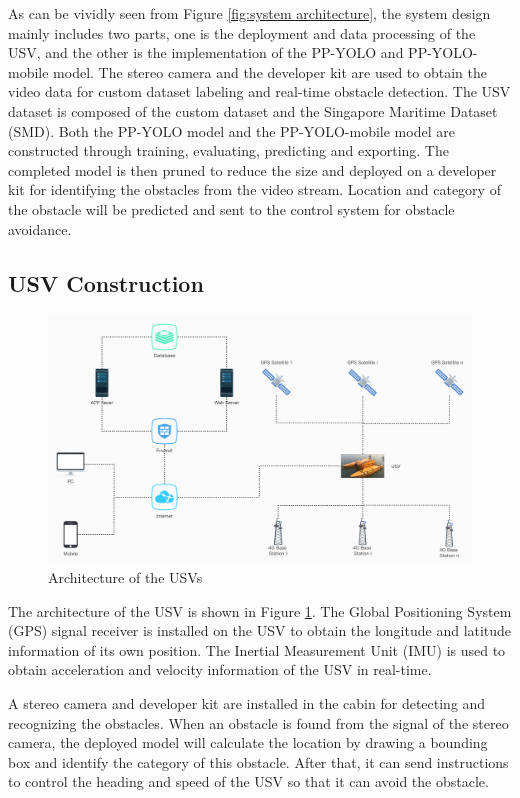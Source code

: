 \documentclass[journal,article,submit,moreauthors,pdftex]{Definitions/mdpi}
\begin{document}
As can be vividly seen from Figure \ref{fig:system architecture}, the system design mainly includes two parts, one is the deployment and data processing of the USV, and the other is the implementation of the PP-YOLO and  PP-YOLO-mobile model. The stereo camera and the developer kit are used to obtain the video data for custom dataset labeling and real-time obstacle detection. The USV dataset is composed of the custom dataset and the Singapore Maritime Dataset (SMD). Both the PP-YOLO model and the PP-YOLO-mobile model are constructed through training, evaluating, predicting and exporting. The completed model is then pruned to reduce the size and deployed on a developer kit for identifying the obstacles from the video stream. Location and category of the obstacle will be predicted and sent to the control system for obstacle avoidance.


\subsection{USV Construction}
\begin{figure}[htbp]
\centering
\includegraphics[width=1\columnwidth]{images/USV-architecture.jpg}
\caption{Architecture of the USVs}
\label{fig:Architecture of USVs}
\end{figure}

The architecture of the USV is shown in Figure \ref{fig:Architecture of USVs}. The Global Positioning System (GPS) signal receiver is installed on the USV to obtain the longitude and latitude information of its own position. The Inertial Measurement Unit (IMU) is used to obtain acceleration and velocity information of the USV in real-time.

A stereo camera and developer kit are installed in the cabin for detecting and recognizing the obstacles. When an obstacle is found from the signal of the stereo camera, the deployed model will calculate the location by drawing a bounding box and identify the category of this obstacle. After that, it can send instructions to control the heading and speed of the USV so that it can avoid the obstacle.
\end{document}
